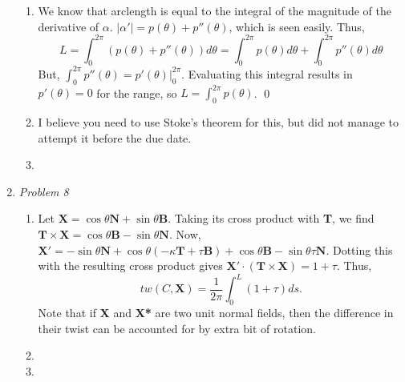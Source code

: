 \documentclass{article}
\begin{document}
\begin{enumerate}
\begin{enumerate}
\item We know that arclength is equal to the integral of the magnitude of the derivative of $\alpha$. 
$|\alpha'| = p(\theta)+p''(\theta)$, which is seen easily. 
Thus, 
\begin{equation*}
L = \displaystyle\int_0^{2\pi} (p(\theta)+p''(\theta))d\theta = \displaystyle\int_0^{2\pi} p(\theta) d\theta + \displaystyle\int_0^{2\pi} p''(\theta) d\theta
\end{equation*}
But, $\displaystyle\int_0^{2\pi} p''(\theta) = p'(\theta)|_0^{2\pi}$.
Evaluating this integral results in $p'(\theta) = 0$ for the range, so $L = \displaystyle\int_0^{2\pi} p(\theta)$. \qed

\item I believe you need to use Stoke's theorem for this, but did not manage to attempt it before the due date.

\item

\end{enumerate}

\item \textit{Problem 8}\\

\begin{enumerate}

\item Let $\mathbf{X} = \cos\theta\mathbf{N} + \sin\theta\mathbf{B}$. 
Taking its cross product with \textbf{T}, we find $\mathbf{T}\times\mathbf{X} = \cos\theta\mathbf{B} - \sin\theta\mathbf{N}$. 
Now, $\mathbf{X'} = -\sin\theta\mathbf{N} + \cos\theta(-\kappa\mathbf{T} + \tau\mathbf{B}) + \cos\theta\mathbf{B} - \sin\theta\tau\mathbf{N}$. 
Dotting this with the resulting cross product gives $\mathbf{X'}\cdot(\mathbf{T}\times\mathbf{X}) = 1 + \tau$.
Thus, 
\begin{equation*}
tw(C,\mathbf{X}) = \frac{1}{2\pi}\displaystyle\int_0^L (1+\tau) ds.
\end{equation*}
Note that if \textbf{X} and \textbf{X*} are two unit normal fields, then the difference in their twist can be accounted for by extra bit of rotation.

\item

\item

\end{enumerate}


\end{enumerate}
\end{document}

